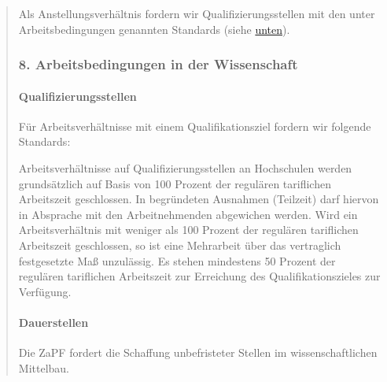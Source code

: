 \documentclass[DIV=14]{scrartcl}
\begin{document}
\begin{quote}
Als Anstellungsverhältnis fordern wir Qualifizierungsstellen mit den unter Arbeitsbedingungen genannten Standards (siehe \href{https://protokolle.zapf.in/reso_BerlHG\#Qualifizierungsstellen}{unten}).


\hypertarget{arbeitsbedingungen-in-der-wissenschaft}{%
\subsubsection*{8. Arbeitsbedingungen in der Wissenschaft}\label{arbeitsbedingungen-in-der-wissenschaft}}

\hypertarget{qualifizierungsstellen}{%
\paragraph{Qualifizierungsstellen}\label{qualifizierungsstellen}}


Für Arbeitsverhältnisse mit einem Qualifikationsziel fordern wir folgende Standards:

Arbeitsverhältnisse auf Qualifizierungsstellen an Hochschulen werden grundsätzlich auf Basis von 100 Prozent der regulären tariflichen Arbeitszeit geschlossen. In begründeten Ausnahmen (Teilzeit) darf hiervon in Absprache mit den Arbeitnehmenden abgewichen werden. Wird ein Arbeitsverhältnis mit weniger als 100 Prozent der regulären tariflichen Arbeitszeit geschlossen, so ist eine Mehrarbeit über das vertraglich festgesetzte Maß unzulässig. Es stehen mindestens 50 Prozent der regulären tariflichen Arbeitszeit zur Erreichung des Qualifikationszieles zur Verfügung.

\hypertarget{dauerstellen}{%
\paragraph{Dauerstellen}\label{dauerstellen}}
Die ZaPF fordert die Schaffung unbefristeter Stellen im wissenschaftlichen Mittelbau.


\end{quote}
\end{document}
